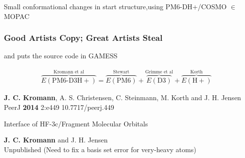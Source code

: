 \begin{frame}[fragile]
\begin{columns}[t]
        \bigskip

    \end{columns}

    \bigskip

    \small
    Small conformational changes in start structure,\newline using PM6-DH+/COSMO $\in$ MOPAC


\end{frame}


\begin{frame}[fragile]

    \frametitle{Good Artists Copy; Great Artists Steal}

    \centering
    and puts the source code in GAMESS

    \begin{align*}
        { \overbrace{E(\mathrm{PM6\text{-}D3H+})}^\text{Kromann et al} } =
        { \overbrace{ E(\mathrm{PM6}) }^\text{Stewart} } +
        { \overbrace{ E(\mathrm{D3}) }^\text{Grimme et al} } +
        { \overbrace{ E(\mathrm{H+}) }^\text{Korth} }
    \end{align*}

    \bigskip

    {\scriptsize
        {\bf J. C. Kromann}, A. S. Christensen, C. Steinmann, M. Korth and J. H. Jensen\\
        PeerJ
        {\bf 2014}
        2:e449
        {10.7717/peerj.449}
    }

    \bigskip

    \bigskip

    \bigskip

    Interface of HF-3c/Fragment Molecular Orbitals

    \bigskip

    {\scriptsize
        {\bf J. C. Kromann} and J. H. Jensen\\
        Unpublished (Need to fix a basis set error for very-heavy atoms)
    }

\end{frame}


